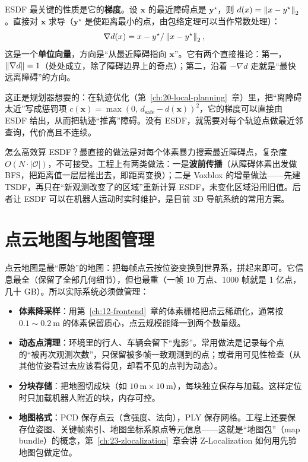 ESDF 最关键的性质是它的\textbf{梯度}。设 $\bm{x}$ 的最近障碍点是 $\bm{y}^{\star}$，则 $d(x)=\left\lVert x-y^{\star} \right\rVert_2$。直接对 $\bm{x}$ 求导（$\bm{y}^{\star}$ 是使距离最小的点，由包络定理可以当作常数处理）：
\begin{equation}
\nabla d(x)
=x-y^{\star}/\left\lVert x-y^{\star} \right\rVert_2,
\label{eq:14-esdf-grad}
\end{equation}
这是一个\textbf{单位向量}，方向是``从最近障碍指向 $\bm{x}$''。它有两个直接推论：第一，$\left\lVert \nabla d \right\rVert=1$（处处成立，除了障碍边界上的奇点）；第二，沿着 $-\nabla d$ 走就是``最快远离障碍''的方向。

这正是规划器想要的：在轨迹优化（第~\ref{ch:20-local-planning}~章）里，把``离障碍太近''写成惩罚项 $c(\bm{x})=\max(0,\,d_{\mathrm{safe}}-d(\bm{x}))^{2}$，它的梯度可以直接由 ESDF 给出，从而把轨迹``推离''障碍。没有 ESDF，就需要对每个轨迹点做最近邻查询，代价高且不连续。

怎么高效算 ESDF？最直接的做法是对每个体素暴力搜索最近障碍点，复杂度 $O(N\cdot|\mathcal{O}|)$，不可接受。工程上有两类做法：一是\textbf{波前传播}（从障碍体素出发做 BFS，把距离值一层层推出去，即距离变换）；二是 Voxblox\cite{oleynikova2017voxblox} 的增量做法——先建 TSDF，再只在``新观测改变了的区域''重新计算 ESDF，未变化区域沿用旧值。后者让 ESDF 可以在机器人运动时实时维护，是目前 3D 导航系统的常用方案。

\section{点云地图与地图管理}\label{sec:14-pointcloud}

点云地图是最``原始''的地图：把每帧点云按位姿变换到世界系，拼起来即可。它信息最全（保留了全部几何细节），但也最重（一帧 10 万点、1000 帧就是 1 亿点，几十 GB）。所以实际系统必须做管理：

\begin{itemize}
  \item \textbf{体素降采样}：用第~\ref{ch:12-frontend}~章的体素栅格把点云稀疏化，通常按 $0.1\sim0.2\ \mathrm{m}$ 的体素保留质心，点云规模能降一到两个数量级。
  \item \textbf{动态点清理}：环境里的行人、车辆会留下``鬼影''。常用做法是记录每个点的``被再次观测次数''，只保留被多帧一致观测到的点；或者用可见性检查（从其他位姿看过去应该看得见，却看不见的点判为动态）。
  \item \textbf{分块存储}：把地图切成块（如 $10\ \mathrm{m}\times10\ \mathrm{m}$），每块独立保存与加载。这样定位时只加载机器人附近的块，内存可控。
  \item \textbf{地图格式}：PCD 保存点云（含强度、法向），PLY 保存网格。工程上还要保存位姿图、关键帧索引、地图坐标系原点等元信息——这就是``地图包''（map bundle）的概念，第~\ref{ch:23-zlocalization}~章会讲 Z-Localization 如何用先验地图包做定位。
\end{itemize}

